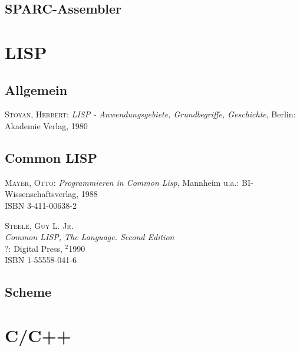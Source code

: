 \subsection{SPARC-Assembler}


\section{LISP}

\subsection{Allgemein}

\begin{description}

\item \textsc{Stoyan, Herbert}:
\textit{LISP - Anwendungsgebiete, Grundbegriffe, Geschichte},
Berlin: Akademie Verlag, 1980

\end{description}

\subsection{Common LISP}

\begin{description}
  
\item \textsc{Mayer, Otto}: \textit{Programmieren in Common Lisp},
  Mannheim u.a.: BI-Wissenschaftsverlag, 1988 \\
  ISBN 3-411-00638-2
  

\item \textsc{Steele, Guy L. Jr.} \\
  \textit{Common LISP, The Language\@. Second Edition} \\
  ?: Digital Press, $^2$1990 \\
  ISBN 1-55558-041-6

\end{description}


\subsection{Scheme}


\section{C/C++}

